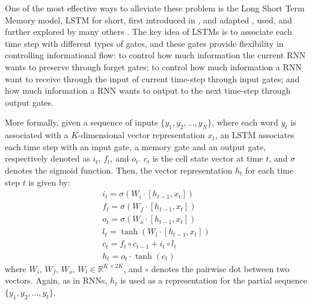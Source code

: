 One of the most effective ways to alleviate these problem is the Long Short Term Memory model, LSTM for short, first  introduced in , and adapted 
, used, and further explored 
by many others \cite{graves2005framewise,graves2009offline,chung2014empirical,tai2015improved,xu2015show,kalchbrenner2015grid,cheng2016long,oord2016pixel,jozefowicz2015empirical,greff2017lstm,zaremba2014recurrent}. The key idea of LSTMs is to associate each time step with different types
of gates, and these gates provide flexibility in controlling informational flow: to control how much 
information the current RNN wants to preserve through forget gates; 
to control how much information a RNN want to receive through the input of current time-step through input gates; and how much information a RNN wants to 
output to the next time-step through output gates. 

More formally, 
given a sequence of inputs  $\{y_1, y_2, ..., y_N\}$, where each word $y_t$ is associated with a $K$-dimensional vector representation $x_t$, 
an LSTM associates each time step with an input gate, a memory gate and an output gate, 
respectively denoted as $i_t$, $f_t$, and $o_t$.
$c_t$ is the cell state vector at time $t$, and
$\sigma$ denotes the sigmoid function. Then, the vector representation $h_t$ for each time step $t$ is given by:
%
\begin{eqnarray}
i_t=\sigma (W_i\cdot [h_{t-1},x_t])\\
f_t=\sigma (W_f\cdot [h_{t-1},x_t])\\
o_t=\sigma (W_o\cdot [h_{t-1},x_t])\\
l_t=\tanh(W_l\cdot [h_{t-1},x_t])\\
c_t=f_t\circ c_{t-1}+i_t\circ l_t\\
h_{t}=o_t\cdot \tanh(c_t)
\end{eqnarray}
where $W_i$, $W_f$, $W_o$, $W_l \in \mathbb{R}^{K\times 2K}$, and $\circ$ denotes the pairwise dot between two vectors. 
Again, as in RNNs, 
$h_t$ is used as a representation for the partial sequence  $\{y_1, y_2, ..., y_{t}\}$.

